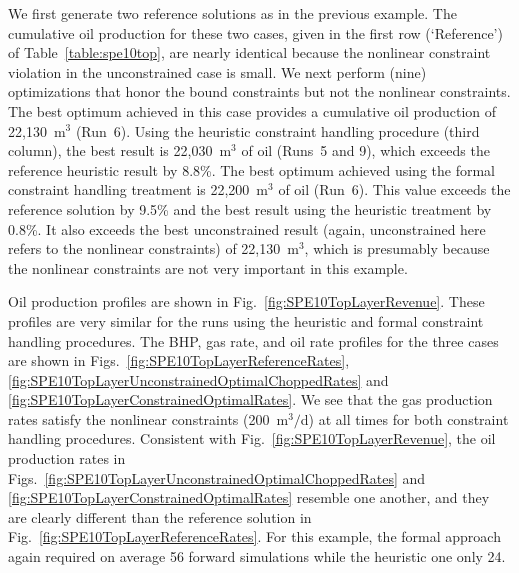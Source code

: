 \documentclass[twocolumn,numbook]{svjour3}          %
\begin{document}
We first generate two reference solutions as in the previous example. The cumulative oil production for these two cases, given in the first row (`Reference') of Table~\ref{table:spe10top}, are nearly identical because the nonlinear constraint violation in the
unconstrained case is small. We next perform (nine) optimizations that honor the bound constraints but not the nonlinear constraints. The best optimum achieved in this case provides a cumulative oil production of 22,130~m$^3$ (Run~6). Using the heuristic constraint handling procedure (third column), the best result is 22,030~m$^3$ of oil (Runs~5 and 9), which
exceeds the reference heuristic result by 8.8\%. The best optimum achieved using the formal constraint handling treatment is 22,200~m$^3$ of oil (Run~6). This value exceeds the reference solution by 9.5\% and the best result using the heuristic treatment by 0.8\%. It also exceeds the best unconstrained result (again, unconstrained here refers to the nonlinear constraints) of 22,130~m$^3$, which is presumably because the nonlinear constraints are not very important in this example.

Oil production profiles are shown in Fig.~\ref{fig:SPE10TopLayerRevenue}. These profiles are very similar for the runs using the heuristic and formal constraint handling procedures. The BHP, gas rate, and oil rate profiles for the three cases are shown in
Figs.~\ref{fig:SPE10TopLayerReferenceRates},
\ref{fig:SPE10TopLayerUnconstrainedOptimalChoppedRates} and
\ref{fig:SPE10TopLayerConstrainedOptimalRates}. We see that the gas production rates satisfy the nonlinear constraints (200~m$^3/$d) at all times for both constraint handling procedures. Consistent with Fig.~\ref{fig:SPE10TopLayerRevenue}, the oil production rates in Figs.~\ref{fig:SPE10TopLayerUnconstrainedOptimalChoppedRates} and
\ref{fig:SPE10TopLayerConstrainedOptimalRates} resemble one another, and they are clearly different than the reference solution in Fig.~\ref{fig:SPE10TopLayerReferenceRates}. 
For this example, the formal approach again required on average 56 forward simulations while the heuristic one only 24.
\end{document}
